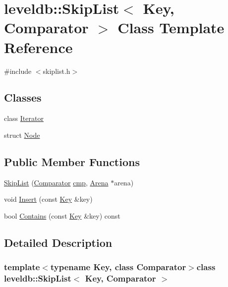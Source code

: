 \hypertarget{classleveldb_1_1_skip_list}{}\section{leveldb\+:\+:Skip\+List$<$ Key, Comparator $>$ Class Template Reference}
\label{classleveldb_1_1_skip_list}


{\ttfamily \#include $<$skiplist.\+h$>$}

\subsection*{Classes}
\begin{DoxyCompactItemize}
\item 
class \hyperlink{classleveldb_1_1_skip_list_1_1_iterator}{Iterator}
\item 
struct \hyperlink{structleveldb_1_1_skip_list_1_1_node}{Node}
\end{DoxyCompactItemize}
\subsection*{Public Member Functions}
\begin{DoxyCompactItemize}
\item 
\hyperlink{classleveldb_1_1_skip_list_a793060fb1b44b01c6f510aa16387c6ee}{Skip\+List} (\hyperlink{structleveldb_1_1_comparator}{Comparator} \hyperlink{table__test_8cc_a87863e435922f0910ca8db43f02a6c0b}{cmp}, \hyperlink{classleveldb_1_1_arena}{Arena} $\ast$arena)
\item 
void \hyperlink{classleveldb_1_1_skip_list_af1ed755f0825f38272aafe3cae4da644}{Insert} (const \hyperlink{namespaceleveldb_a7e9a9725b13fa0bd922d885280dfab95}{Key} \&key)
\item 
bool \hyperlink{classleveldb_1_1_skip_list_a134b36bafbfecf325bb7b57bc2490f87}{Contains} (const \hyperlink{namespaceleveldb_a7e9a9725b13fa0bd922d885280dfab95}{Key} \&key) const 
\end{DoxyCompactItemize}


\subsection{Detailed Description}
\subsubsection*{template$<$typename Key, class Comparator$>$class leveldb\+::\+Skip\+List$<$ Key, Comparator $>$}



